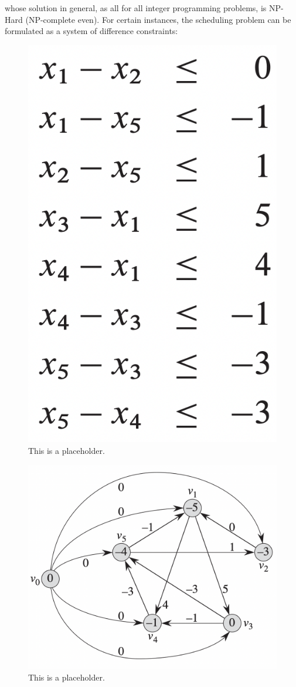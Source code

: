 whose solution in general, as all for all integer programming problems, is NP-Hard (NP-complete even).
For certain instances, the scheduling problem can be formulated as a system of difference constraints:  
\begin{figure}[H]
  \includegraphics[height=\columnwidth]{figures/sdc_constraints.png}
  \caption{This is a placeholder.}
\end{figure}
\begin{figure}
  \includegraphics[width=\columnwidth]{figures/sdc_graph.png}
  \caption{This is a placeholder.}
\end{figure}

